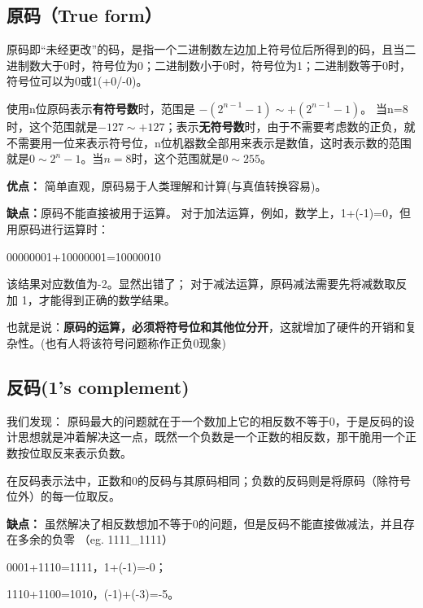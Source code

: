 \begin{issues}
\issueDraft
\issueNeedCite
\end{issues}

\subsection{原码（True form）}

原码即“未经更改”的码，是指一个二进制数左边加上符号位后所得到的码，且当二进制数大于0时，符号位为0；二进制数小于0时，符号位为1；二进制数等于0时，符号位可以为0或1(+0/-0)。

使用n位原码表示\textbf{有符号数}时，范围是 $-(2^{n-1}-1)\sim +(2^{n-1}-1)$。 当n=8时，这个范围就是$-127\sim +127 $；表示\textbf{无符号数}时，由于不需要考虑数的正负，就不需要用一位来表示符号位，n位机器数全部用来表示是数值，这时表示数的范围就是$0\sim 2^{n}-1$。当$n=8$时，这个范围就是$0\sim 255$。


\textbf{优点：}
简单直观，原码易于人类理解和计算(与真值转换容易)。

\textbf{缺点：}原码不能直接被用于运算。
对于加法运算，例如，数学上，1+(-1)=0，但用原码进行运算时：


\begin{example}{}
00000001+10000001=10000010
\end{example}


该结果对应数值为-2。显然出错了；
对于减法运算，原码减法需要先将减数取反加 1，才能得到正确的数学结果。

也就是说：\textbf{原码的运算，必须将符号位和其他位分开}，这就增加了硬件的开销和复杂性。(也有人将该符号问题称作正负0现象)


\subsection{反码(1's complement)}

我们发现：
原码最大的问题就在于一个数加上它的相反数不等于0，于是反码的设计思想就是冲着解决这一点，既然一个负数是一个正数的相反数，那干脆用一个正数按位取反来表示负数。

在反码表示法中，正数和0的反码与其原码相同；负数的反码则是将原码（除符号位外）的每一位取反。

\textbf{缺点：}
虽然解决了相反数想加不等于0的问题，但是反码不能直接做减法，并且存在多余的负零 （eg. 1111_1111）

\begin{example}{}
0001+1110=1111，1+(-1)=-0；

1110+1100=1010，(-1)+(-3)=-5。
\end{example}

